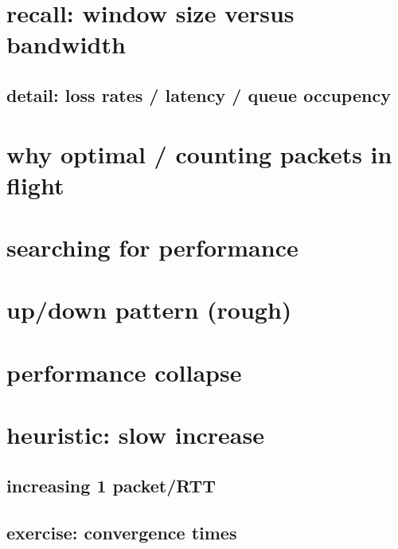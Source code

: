 
\section{recall: window size versus bandwidth}


\subsection{detail: loss rates / latency / queue occupency}
\section{why optimal / counting packets in flight}


\section{searching for performance}


\section{up/down pattern (rough)}


\section{performance collapse}


\section{heuristic: slow increase}


\subsection{increasing 1 packet/RTT}

\subsection{exercise: convergence times}

